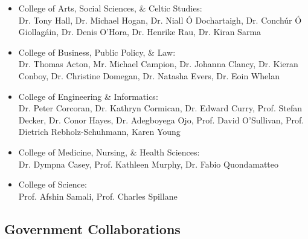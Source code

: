 \documentclass[10pt,a4paper]{res} %
\begin{document}
\begin{resume}
\begin{itemize}
\begin{itemize} \itemsep -2pt
\item College of Arts, Social Sciences, \& Celtic Studies: \\ Dr. Tony Hall, Dr. Michael Hogan, Dr. Niall \'{O} Dochartaigh, Dr. Conch\'{u}r \'{O} Giollag\'{a}in, Dr. Denis O'Hora, Dr. Henrike Rau, Dr. Kiran Sarma
\item College of Business, Public Policy, \& Law: \\ Dr. Thomas Acton, Mr. Michael Campion, Dr. Johanna Clancy, Dr. Kieran Conboy, Dr. Christine Domegan, Dr. Natasha Evers, Dr. Eoin Whelan
\item College of Engineering \& Informatics: \\ Dr. Peter Corcoran, Dr. Kathryn Cormican, Dr. Edward Curry, Prof. Stefan Decker, Dr. Conor Hayes, Dr. Adegboyega Ojo, Prof. David O'Sullivan, Prof. Dietrich Rebholz-Schuhmann, Karen Young
\item College of Medicine, Nursing, \& Health Sciences: \\ Dr. Dympna Casey, Prof. Kathleen Murphy, Dr. Fabio Quondamatteo
\item College of Science: \\ Prof. Afshin Samali, Prof. Charles Spillane
\end{itemize}
\end{itemize}

\subsection*{Government Collaborations}


\end{resume}
\end{document}

